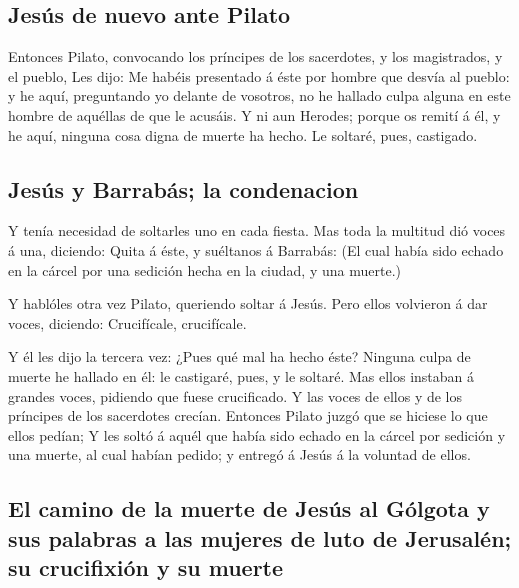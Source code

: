 \hypertarget{jesuxfas-de-nuevo-ante-pilato}{%
\subsection{Jesús de nuevo ante
Pilato}\label{jesuxfas-de-nuevo-ante-pilato}}

 Entonces Pilato, convocando los príncipes de los
sacerdotes, y los magistrados, y el pueblo,  Les dijo: Me
habéis presentado á éste por hombre que desvía al pueblo: y he aquí,
preguntando yo delante de vosotros, no he hallado culpa alguna en este
hombre de aquéllas de que le acusáis.  Y ni aun Herodes;
porque os remití á él, y he aquí, ninguna cosa digna de muerte ha hecho.
 Le soltaré, pues, castigado.

\hypertarget{jesuxfas-y-barrabuxe1s-la-condenacion}{%
\subsection{Jesús y Barrabás; la
condenacion}\label{jesuxfas-y-barrabuxe1s-la-condenacion}}

 Y tenía necesidad de soltarles uno en cada fiesta.
 Mas toda la multitud dió voces á una, diciendo: Quita á
éste, y suéltanos á Barrabás:  (El cual había sido echado
en la cárcel por una sedición hecha en la ciudad, y una muerte.)

 Y hablóles otra vez Pilato, queriendo soltar á Jesús.
 Pero ellos volvieron á dar voces, diciendo: Crucifícale,
crucifícale.

 Y él les dijo la tercera vez: ¿Pues qué mal ha hecho
éste? Ninguna culpa de muerte he hallado en él: le castigaré, pues, y le
soltaré.  Mas ellos instaban á grandes voces, pidiendo
que fuese crucificado. Y las voces de ellos y de los príncipes de los
sacerdotes crecían.  Entonces Pilato juzgó que se hiciese
lo que ellos pedían;  Y les soltó á aquél que había sido
echado en la cárcel por sedición y una muerte, al cual habían pedido; y
entregó á Jesús á la voluntad de ellos.

\hypertarget{el-camino-de-la-muerte-de-jesuxfas-al-guxf3lgota-y-sus-palabras-a-las-mujeres-de-luto-de-jerusaluxe9n-su-crucifixiuxf3n-y-su-muerte}{%
\subsection{El camino de la muerte de Jesús al Gólgota y sus palabras a
las mujeres de luto de Jerusalén; su crucifixión y su
muerte}\label{el-camino-de-la-muerte-de-jesuxfas-al-guxf3lgota-y-sus-palabras-a-las-mujeres-de-luto-de-jerusaluxe9n-su-crucifixiuxf3n-y-su-muerte}}

